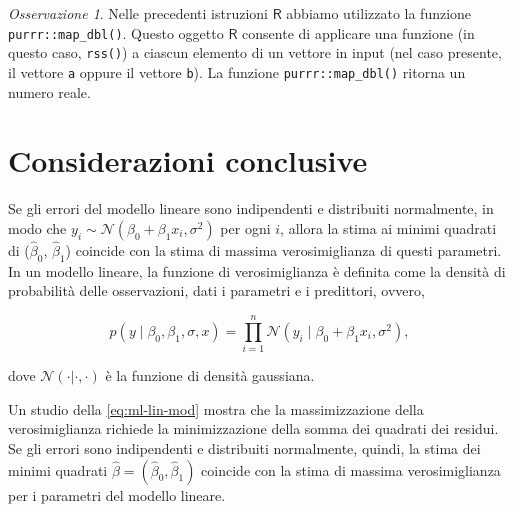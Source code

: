 \documentclass[
  11pt,
]{krantz}
\newcommand{\R}{\textsf{R}} %
\theoremstyle{definition}
\theoremstyle{definition}
\theoremstyle{definition}
\theoremstyle{definition}
\theoremstyle{remark}
\newtheorem*{remark}{Osservazione}
\begin{document}
\begin{remark}
Nelle precedenti istruzioni \(\R\) abbiamo utilizzato la funzione \texttt{purrr::map\_dbl()}. Questo oggetto \(\R\) consente di applicare una funzione (in questo caso, \texttt{rss()}) a ciascun elemento di un vettore in input (nel caso presente, il vettore \texttt{a} oppure il vettore \texttt{b}). La funzione \texttt{purrr::map\_dbl()} ritorna un numero reale.
\end{remark}

\hypertarget{considerazioni-conclusive-1}{%
\section*{Considerazioni conclusive}\label{considerazioni-conclusive-1}}


Se gli errori del modello lineare sono indipendenti e distribuiti normalmente, in modo che \(y_i \sim \mathcal{N}(\beta_0 + \beta_1 x_i, \sigma^2)\) per ogni \(i\), allora la stima ai minimi quadrati di (\(\hat{\beta}_0\), \(\hat{\beta}_1\)) coincide con la stima di massima verosimiglianza di questi parametri. In un modello lineare, la funzione di verosimiglianza è definita come la densità di probabilità delle osservazioni, dati i parametri e i predittori, ovvero,

\begin{equation}
 p(y \mid \beta_0, \beta_1, \sigma, x) = \prod_{i=1}^n \mathcal{N}(y_i \mid \beta_0 + \beta_1 x_i, \sigma^2),
 \label{eq:ml-lin-mod}
\end{equation}

dove \(\mathcal{N}(\cdot | \cdot, \cdot)\) è la funzione di densità gaussiana.

Un studio della \eqref{eq:ml-lin-mod} mostra che la massimizzazione della verosimiglianza richiede la minimizzazione della somma dei quadrati dei residui. Se gli errori sono indipendenti e distribuiti normalmente, quindi, la stima dei minimi quadrati \(\hat{\beta} = (\hat{\beta}_0, \hat{\beta}_1)\) coincide con la stima di massima verosimiglianza per i parametri del modello lineare.

  

\printindex
\end{document}
